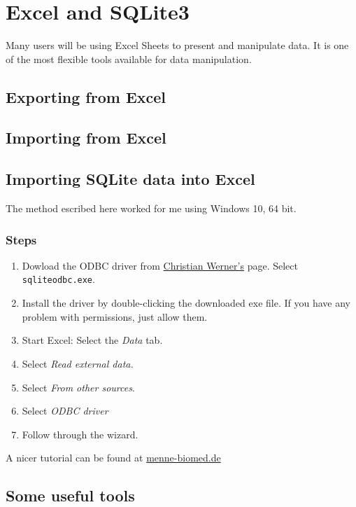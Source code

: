 \chapter{Excel and SQLite3}

Many users will be using Excel Sheets to present and manipulate data. It is one of the most flexible
tools available for data manipulation.

\section{Exporting from Excel}

\section{Importing from Excel}

\section{Importing SQLite data into Excel}

The method escribed here worked for me using Windows 10, 64 bit.

\subsection{Steps}

\begin{enumerate}
\item Dowload the ODBC driver from \href{http://www.ch-werner.de/sqliteodbc/}{Christian Werner's} page. Select \texttt{sqliteodbc.exe}.

\item Install the driver by double-clicking the downloaded exe file. If you have any problem with permissions, just allow them.
\item  Start Excel: Select the \textit{Data} tab.
\item Select \textit{Read external data.}
\item Select \textit{From other sources}.
\item Select \textit{ODBC driver}
\item Follow through the wizard. 
\end{enumerate}

A nicer tutorial can be found at \href{https://menne-biomed.de/blog/sqlite-excel}{menne-biomed.de}

\section{Some useful tools}

